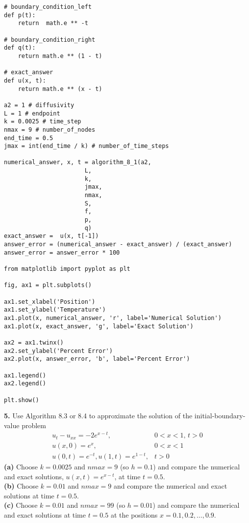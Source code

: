 \documentclass{amsbook}%
\theoremstyle{plain}
\numberwithin{equation}{section}
\begin{document}
\begin{small}
\begin{verbatim}
# boundary_condition_left
def p(t):
    return  math.e ** -t

# boundary_condition_right
def q(t):
    return math.e ** (1 - t)

# exact_answer	
def u(x, t):
	return math.e ** (x - t)

a2 = 1 # diffusivity
L = 1 # endpoint
k = 0.0025 # time_step
nmax = 9 # number_of_nodes
end_time = 0.5
jmax = int(end_time / k) # number_of_time_steps

numerical_answer, x, t = algorithm_8_1(a2,
                       L,
                       k,
                       jmax,
                       nmax,
                       S,
                       f,
                       p,
                       q)
exact_answer = 	u(x, t[-1])
answer_error = (numerical_answer - exact_answer) / (exact_answer)
answer_error = answer_error * 100

from matplotlib import pyplot as plt

fig, ax1 = plt.subplots()

ax1.set_xlabel('Position')
ax1.set_ylabel('Temperature')
ax1.plot(x, numerical_answer, 'r', label='Numerical Solution')
ax1.plot(x, exact_answer, 'g', label='Exact Solution')

ax2 = ax1.twinx()
ax2.set_ylabel('Percent Error')
ax2.plot(x, answer_error, 'b', label='Percent Error')

ax1.legend()
ax2.legend()

plt.show()
\end{verbatim}
\end{small}
		
		\noindent\textbf{5.} Use Algorithm 8.3 or 8.4 to approximate the solution of the initial-boundary-value problem 
		\begin{align}
			u_t-u_{xx}=-2e^{x-t}, & 0<x<1,\, t>0\\
			u(x,0)=e^x, & 0<x<1\\
			u(0,t)=e^{-t}, u(1,t)=e^{1-t}, & t>0
		\end{align}
		\textbf{(a)} Choose $k=0.0025$ and $nmax=9$ (so $h=0.1$) and compare the numerical and exact solutions, $u(x,t)=e^{x-t}$, at time $t=0.5$.\\
		\textbf{(b)} Choose $k=0.01$ and $nmax=9$ and compare the numerical and exact solutions at time $t=0.5$.\\
		\textbf{(c)} Choose $k=0.01$ and $nmax=99$ (so $h=0.01$) and compare the numerical and exact solutions at time $t=0.5$ at the positions $x=0.1,0.2,\ldots ,0.9$.
		\\[12pt]
\end{document}
